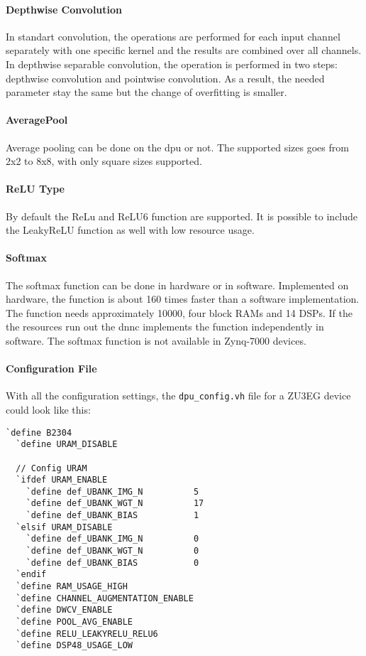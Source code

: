 \paragraph{Depthwise Convolution}
In standart convolution, the operations are performed for each input channel separately with one specific kernel and the results are combined over all channels.
In depthwise separable convolution, the operation is performed in two steps: depthwise convolution and pointwise convolution.
As a result, the needed parameter stay the same but the change of overfitting is smaller.

\paragraph{AveragePool}
Average pooling can be done on the \acrshort{dpu} or not.
The supported sizes goes from 2x2 to 8x8, with only square sizes supported.

\paragraph{ReLU Type}
By default the ReLu and ReLU6 function are supported.
It is possible to include the LeakyReLU function as well with low resource usage.

\paragraph{Softmax}
The softmax function can be done in hardware or in software.
Implemented on hardware, the function is about 160 times faster than a software implementation.
The function needs approximately \SI{10000}{}, four block RAMs and 14 DSPs.
If the the resources run out the \acrlong{dnnc} implements the function independently in software.
The softmax function is not available in Zynq-7000 devices. 

\paragraph{Configuration File}
With all the configuration settings, the \texttt{dpu\_config.vh} file for a ZU3EG device could look like this:
\begin{lstlisting}[style=bash, caption={}, label=lst:config_dpu]
  `define B2304
  `define URAM_DISABLE 

  // Config URAM
  `ifdef URAM_ENABLE
    `define def_UBANK_IMG_N          5
    `define def_UBANK_WGT_N          17
    `define def_UBANK_BIAS           1
  `elsif URAM_DISABLE
    `define def_UBANK_IMG_N          0
    `define def_UBANK_WGT_N          0
    `define def_UBANK_BIAS           0
  `endif
  `define RAM_USAGE_HIGH
  `define CHANNEL_AUGMENTATION_ENABLE
  `define DWCV_ENABLE
  `define POOL_AVG_ENABLE
  `define RELU_LEAKYRELU_RELU6
  `define DSP48_USAGE_LOW
\end{lstlisting}

